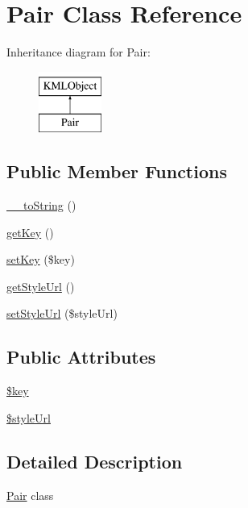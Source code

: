 \hypertarget{classPair}{
\section{Pair Class Reference}
\label{d0/d04/classPair}
}
Inheritance diagram for Pair:\begin{figure}[H]
\begin{center}
\leavevmode
\includegraphics[height=2.000000cm]{d0/d04/classPair}
\end{center}
\end{figure}
\subsection*{Public Member Functions}
\begin{DoxyCompactItemize}
\item 
\hyperlink{classPair_adfc2b85ac7e2e94a344d5952a538155c}{\_\-\_\-toString} ()
\item 
\hyperlink{classPair_aed1430a0918ac01a8a9af3b4c7a0a8e7}{getKey} ()
\item 
\hyperlink{classPair_a045190277c46f7f781726b521a9a636b}{setKey} (\$key)
\item 
\hyperlink{classPair_a7234b2e6b82a68db93746f44c20e44d2}{getStyleUrl} ()
\item 
\hyperlink{classPair_a75cb93cc604de81e20e01d1602438bce}{setStyleUrl} (\$styleUrl)
\end{DoxyCompactItemize}
\subsection*{Public Attributes}
\begin{DoxyCompactItemize}
\item 
\hyperlink{classPair_a1483bc5250d2b0dd06021f2b6077e015}{\$key}
\item 
\hyperlink{classPair_ad31b5badb609fa071ef67aaa8bc0feb8}{\$styleUrl}
\end{DoxyCompactItemize}


\subsection{Detailed Description}
\hyperlink{classPair}{Pair} class 

